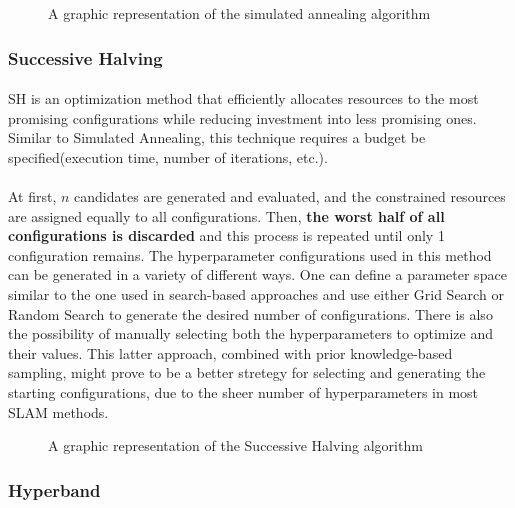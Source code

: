 \begin{figure}[h]
    \centering
    
    \caption{A graphic representation of the simulated annealing algorithm}
    \label{fig:enter-label}
\end{figure}

\subsubsection{Successive Halving}
\paragraph{}\ac{SH} is an optimization method that efficiently allocates resources to the most promising configurations while reducing investment into less promising ones\cite{soper2021greed}. Similar to Simulated Annealing, this technique requires a budget be specified(execution time, number of iterations, etc.).
\paragraph{}At first, $n$ candidates are generated and evaluated, and the constrained resources are assigned equally to all configurations. Then, \textbf{the worst half of all configurations is discarded} and this process is repeated until only 1 configuration remains\cite{huang2019survey}. The hyperparameter configurations used in this method can be generated in a variety of different ways. One can define a parameter space similar to the one used in search-based approaches and use either Grid Search or Random Search to generate the desired number of configurations. There is also the possibility of manually selecting both the hyperparameters to optimize and their values. This latter approach, combined with prior knowledge-based sampling, might prove to be a better stretegy for selecting and generating the starting configurations, due to the sheer number of hyperparameters in most SLAM methods.

\begin{figure}[h]
    \centering
    
    \caption{A graphic representation of the Successive Halving algorithm}
    \label{fig:enter-label}
\end{figure}

\newpage

\subsubsection{Hyperband}
